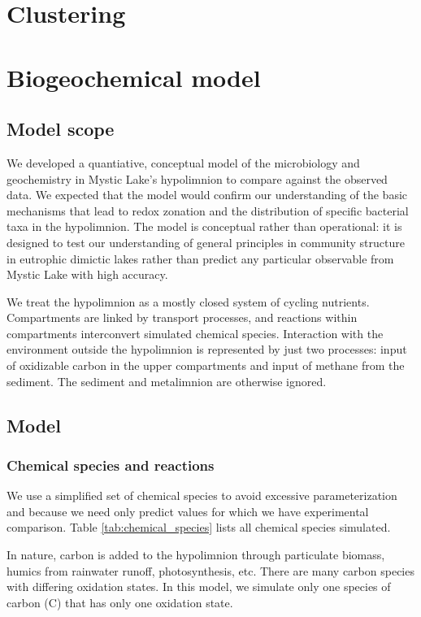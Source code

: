 \documentclass{report}
\begin{document}
\chapter{Clustering}

\chapter{Biogeochemical model}
\section{Model scope}
We developed a quantiative, conceptual model of the microbiology and geochemistry in Mystic Lake's
hypolimnion to compare against the observed data. We expected that the model would confirm
our understanding of the basic mechanisms that lead to redox zonation and the distribution
of specific bacterial taxa in the hypolimnion. The model is conceptual rather than operational: it
is designed to test our understanding of general principles in community structure in
eutrophic dimictic lakes rather than predict any particular observable from Mystic Lake with
high accuracy.

We treat the hypolimnion as a mostly closed system of cycling nutrients. Compartments are
linked by transport processes, and reactions within compartments interconvert simulated chemical
species. Interaction with the environment outside the hypolimnion is represented by just two
processes: input of oxidizable carbon in the upper compartments and input of methane from
the sediment. The sediment and metalimnion are otherwise ignored.

\section{Model}
\subsection{Chemical species and reactions}
We use a simplified set of chemical species to avoid excessive parameterization and
because we need only predict values for which we have experimental comparison. Table
\ref{tab:chemical_species} lists all chemical species simulated.

In nature, carbon is added to the hypolimnion through particulate biomass, humics from
rainwater runoff, photosynthesis,
etc. There are many carbon species with differing oxidation states. In this model, we 
simulate only one species of carbon (C) that has only one oxidation state.
\end{document}
